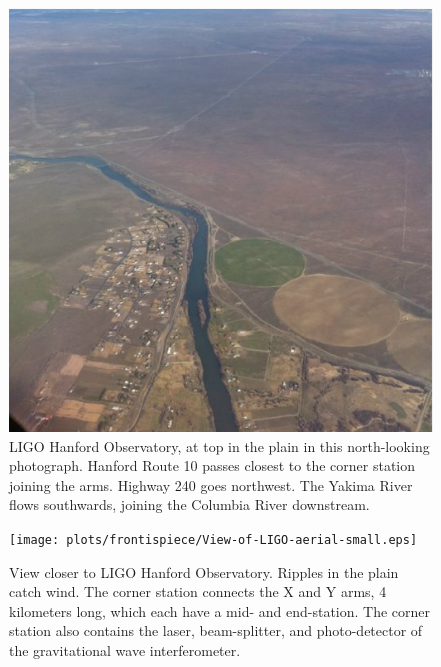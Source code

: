 \begin{figure}
\begin{center}
\includegraphics[keepaspectratio=true,scale=0.75]{plots/frontispiece/LIGO_Hanford_Observatory_from_above_Rattlesnake-small.eps} 
\caption{
LIGO Hanford Observatory, at top in the plain in this north-looking photograph.
Hanford Route 10 passes closest to the corner station joining the arms. 
Highway 240 goes northwest. 
The Yakima River flows southwards, joining the Columbia River downstream.
}
\end{center}
\end{figure}

\begin{figure}
\begin{center}
\texttt{[image: plots/frontispiece/View-of-LIGO-aerial-small.eps]} 
\caption{
View closer to LIGO Hanford Observatory. 
Ripples in the plain catch wind.
The corner station connects the X and Y arms, 4 kilometers long, which each have a mid- and end-station. 
The corner station also contains the laser, beam-splitter, and photo-detector of the gravitational wave interferometer.
}
\end{center}
\end{figure}
            
%

